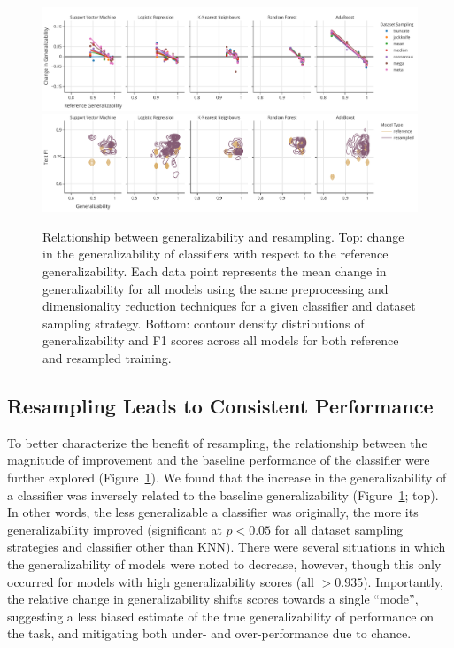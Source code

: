 \documentclass[num-refs]{nbdt-article}
\begin{document}
\begin{figure}[t!]\centering
\includegraphics[width=\linewidth]{figures/2a.pdf}
\includegraphics[width=\linewidth]{figures/2b.pdf}
\caption{Relationship between generalizability and resampling. Top: change in the generalizability of classifiers with respect to the reference generalizability. Each data point represents the mean change in generalizability for all models using the same preprocessing and dimensionality reduction techniques for a given classifier and dataset sampling strategy. Bottom: contour density distributions of generalizability and F1 scores across all models for both reference and resampled training.
}
\label{fig:change_in_gen}
\end{figure}

\subsection{Resampling Leads to Consistent Performance}
To better characterize the benefit of resampling, the relationship between the magnitude of improvement and the baseline performance of the classifier were further explored (Figure~\ref{fig:change_in_gen}). We found that the increase in the generalizability of a classifier was inversely related to the baseline generalizability (Figure~\ref{fig:change_in_gen}; top). In other words, the less generalizable a classifier was originally, the more its generalizability improved (significant at $p < 0.05$ for all dataset sampling strategies and classifier other than KNN). There were several situations in which the generalizability of models were noted to decrease, however, though this only occurred for models with high generalizability scores (all $>0.935$). Importantly, the relative change in generalizability shifts scores towards a single ``mode'', suggesting a less biased estimate of the true generalizability of performance on the task, and mitigating both under- and over-performance due to chance.
\end{document}
